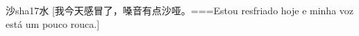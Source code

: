 \begin{EntryWithPhonetic}{沙}{sha1}{7}{⽔}
  [我今天感冒了，嗓音有点沙哑。===Estou resfriado hoje e minha voz está um pouco rouca.]
\end{EntryWithPhonetic}
